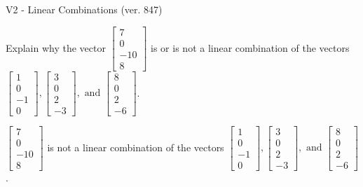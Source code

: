 \begin{exercise}
  \begin{exerciseTitle}V2 - Linear Combinations (ver. 847)\end{exerciseTitle}
  \begin{exerciseStatement}
    Explain why the vector \(\left[\begin{array}{c}
7 \\
0 \\
-10 \\
8
\end{array}\right]\)  is or is not a linear 
	combination of the vectors \(\left[\begin{array}{c}
1 \\
0 \\
-1 \\
0
\end{array}\right] , \left[\begin{array}{c}
3 \\
0 \\
2 \\
-3
\end{array}\right] , \text{ and } \left[\begin{array}{c}
8 \\
0 \\
2 \\
-6
\end{array}\right]\).
	


  \end{exerciseStatement}
  \begin{exerciseAnswer}
   \(\left[\begin{array}{c}
7 \\
0 \\
-10 \\
8
\end{array}\right]\) 
  	 is not  
	a linear combination of the vectors \(\left[\begin{array}{c}
1 \\
0 \\
-1 \\
0
\end{array}\right] , \left[\begin{array}{c}
3 \\
0 \\
2 \\
-3
\end{array}\right] , \text{ and } \left[\begin{array}{c}
8 \\
0 \\
2 \\
-6
\end{array}\right]\).

	
  


  \end{exerciseAnswer}
\end{exercise}
